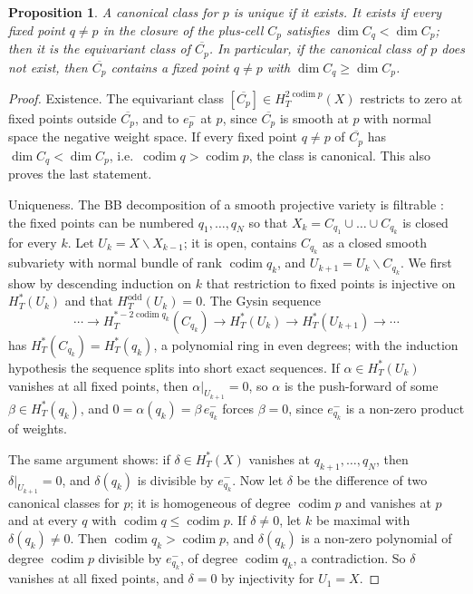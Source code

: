 \documentclass[11pt]{amsart}
\newtheorem{proposition}[theorem]{Proposition}
\theoremstyle{definition}
\theoremstyle{remark}
\DeclareMathOperator{\codim}{codim}
\begin{document}
\begin{proposition}\label{prop:canonical}
A canonical class for $p$ is unique if it exists. It exists if every
fixed point $q\ne p$ in the closure of the plus-cell $C_p$ satisfies
$\dim C_q<\dim C_p$; then it is the equivariant class of
$\overline{C_p}$. In particular, if the canonical class of $p$ does not exist,
then $\overline{C_p}$ contains a fixed point $q\ne p$ with $\dim C_q\ge \dim C_p$.
\end{proposition}
\begin{proof}
Existence. The equivariant class $[\overline{C_p}]\in H_T^{2\codim
p}(X)$ restricts to zero at fixed points outside $\overline{C_p}$, and to
$e^-_p$ at $p$, since $\overline{C_p}$ is smooth at $p$ with normal space the
negative weight space. If every fixed point $q\ne p$ of $\overline{C_p}$
has $\dim C_q<\dim C_p$, i.e.\ $\codim q>\codim p$, the class is canonical.
This also proves the last statement.

Uniqueness. The BB decomposition of a smooth projective variety is
filtrable \cite{BB76}: the fixed points can be numbered
$q_1,\dots,q_N$ so that $X_k = C_{q_1}\cup\dots\cup C_{q_k}$ is closed for
every $k$. Let $U_k = X\smallsetminus X_{k-1}$; it is open, contains
$C_{q_k}$ as a closed smooth subvariety with normal bundle of rank $\codim
q_k$, and $U_{k+1} = U_k\smallsetminus C_{q_k}$. We first show by descending
induction on $k$ that restriction to fixed points is injective on
$H_T^*(U_k)$ and that $H_T^{\mathrm{odd}}(U_k)=0$. The Gysin sequence
\[
\cdots\to H_T^{*-2\codim q_k}(C_{q_k})\to H_T^*(U_k)\to H_T^*(U_{k+1})\to\cdots
\]
has $H_T^*(C_{q_k}) = H_T^*(q_k)$, a polynomial ring in even degrees; with
the induction hypothesis the sequence splits into short exact sequences.
If $\alpha\in H_T^*(U_k)$ vanishes at all fixed points, then
$\alpha|_{U_{k+1}}=0$, so $\alpha$ is the push-forward of some $\beta\in
H_T^*(q_k)$, and $0=\alpha(q_k) = \beta\,e^-_{q_k}$ forces $\beta=0$, since
$e^-_{q_k}$ is a non-zero product of weights.

The same argument shows: if $\delta\in H_T^*(X)$ vanishes at $q_{k+1},\dots,q_N$,
then $\delta|_{U_{k+1}}=0$, and $\delta(q_k)$ is divisible by $e^-_{q_k}$. Now
let $\delta$ be the difference of two canonical classes for $p$; it is
homogeneous of degree $\codim p$ and vanishes at $p$ and at every $q$ with
$\codim q\le\codim p$. If $\delta\ne0$, let $k$ be maximal with
$\delta(q_k)\ne0$. Then $\codim q_k>\codim p$, and $\delta(q_k)$ is a
non-zero polynomial of degree $\codim p$ divisible by $e^-_{q_k}$, of
degree $\codim q_k$, a contradiction. So $\delta$ vanishes at all fixed
points, and $\delta=0$ by injectivity for $U_1=X$.
\end{proof}
\end{document}

